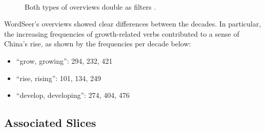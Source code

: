 \documentclass{sig-alternate}
\begin{document}
\begin{figure}[ht!]
\begin{center}
%
        \\
%
    \end{center}
    \caption{%
     Both types of overviews double as filters \label{fig:intro04}.
     }%
\end{figure}

WordSeer's overviews showed clear differences between the decades. In particular, the increasing  frequencies of growth-related verbs contributed to a sense of China's rise, as shown by the frequencies per decade below:
\begin{itemize}
\item ``grow, growing'':  294, 232, 421
\item ``rise, rising'': 101, 134, 249
\item ``develop, developing'': 274, 404, 476
\end{itemize}

\subsection{Associated Slices}
\end{document}
